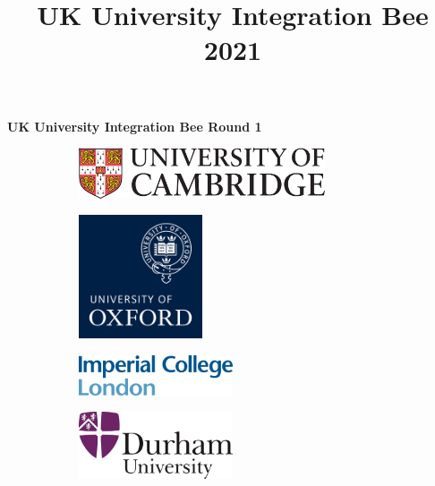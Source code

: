 \documentclass{article}
\title{UK University Integration Bee 2021}
\author{}
\date{}
\begin{document}
\begin{titlepage}
   \begin{center}
       \vspace*{1cm}
        \LARGE
       \textbf{UK University Integration Bee Round 1}
       
       \vspace{0.8cm}
       
       \begin{figure}[h]
            \centering
            \begin{subfigure}{0.5\textwidth}
                \includegraphics[width=0.8\textwidth]{University_of_Cambridge_logo.png}
                \label{fig:sub1}
            \end{subfigure}%
            \hfill
            \begin{subfigure}{0.5\textwidth}
                \includegraphics[width=0.4\textwidth]{University of Oxford logo.png}
            \end{subfigure}
            \begin{subfigure}{0.5\textwidth}
            \vspace{2cm}
                \includegraphics[width=0.5\textwidth]{Imperial College London logo.png}  
            \end{subfigure}%
            \begin{subfigure}{0.5\textwidth}
                \includegraphics[width=0.5\textwidth]{Durham_University_Logo.png} 

\end{subfigure}
\end{figure}
\end{center}
\end{titlepage}
\end{document}
